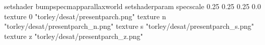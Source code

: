 setshader bumpspecmapparallaxworld
setshaderparam specscale 0.25 0.25 0.25 0.0
texture 0 "torley/desat/presentparch.png"
texture n "torley/desat/presentparch_n.png"
texture s "torley/desat/presentparch_s.png"
texture z "torley/desat/presentparch_z.png"

